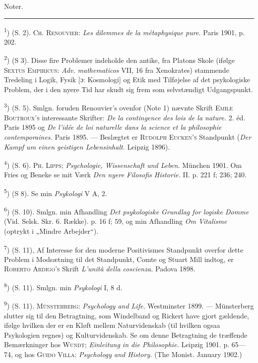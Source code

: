 \documentclass[12pt,a4paper,openany]{book}
\newcommand{\opage}[1]{\marginnote{\footnotesize\textit{[#1]}}}
\begin{document}
\begin{small}
\opage{85}

\begin{center}{\LARGE Noter.}\\[6pt]\rule{1.5cm}{0.4pt}\end{center}

\textsuperscript{1}) (S. 2). \textsc{Ch. Renouvier}: \textit{Les dilemmes de la
métaphysique pure.} Paris 1901, p. 202.

\textsuperscript{2}) (S 3). %
 Disse fire Problemer indeholde den antike, fra Platons Skole (ifølge
\textsc{Sextus} \textsc{Empiricus}: \textit{Adv. mathematicos} VII, 16 fra
Xenokrates) stammende Tredeling i Logik, Fysik [ɔ: Kosmologi] og Etik med
Tilføjelse af det psykologiske Problem, der i den nyere Tid har skudt sig frem
som selvstændigt Udgangspunkt.

\textsuperscript{3}) (S. 5). Smlgn. foruden Renouvier's ovenfor (Note 1) nævnte
Skrift \textsc{Emile Boutroux's} interessante Skrifter: \textit{De la
contingence des lois de la nature.} 2. éd. Paris 1895 og \textit{De l'idée de
loi naturelle dans la science et la philosophie contemporaines.} Paris 1895.
--- Beslægtet er \textsc{Rudolph Eucken's} Standpunkt (\textit{Der Kampf um
einen geistigen Lebensinhalt.} Leipzig 1896).

\textsuperscript{4}) (S. 6). \textsc{Ph.} \textsc{Lipps}; \textit{Psychologie,
Wissenschaft und Leben.} München 1901. Om Fries og Beneke se mit Værk
\textit{Den nyere Filosofis Historie.} II. p. 221 f; 236; 240.

\textsuperscript{5}) (S 8). %
 Se min \textit{Psykologi} V A, 2.

\textsuperscript{6}) (S. 10). Smlgn. min Afhandling \textit{Det psykologiske
Grundlag for logiske Domme} (Vid. Selsk. Skr. 6. Række). p. 16 f; 59, og min
Afhandling \textit{Om Vitalisme} (optrykt i „Mindre Arbejder“).

\textsuperscript{7}) (S. 11), Af Interesse for den moderne Positivismes
Standpunkt overfor dette Problem i Modsætning til det Standpunkt, Comte og
Stuart Mill indtog, er \textsc{Roberto Ardigo's} Skrift \textit{L'unità della
coscienza.} Padova 1898.

\textsuperscript{8}) (S. 11). Smlgn. min \textit{Psykologi} I, 8 d.

\textsuperscript{9}) (S. 11). \textsc{Münstehrerg}: \textit{Psychology and
Life.} Westminster 1899. --- Münsterberg slutter sig til den Betragtning, som
Windelband og Rickert have gjort gældende, ifølge hvilken der er en Kløft
mellem Naturvidenskab (til hvilken ogsaa Psykologien regnes) og
Kulturvidenskab. Se om denne Betragtning de træffende Bemærkninger hos
\textsc{Wundt;} \textit{Einleitung in die Philosophie.} Leipzig 1901. p.
65---74, og hos \textsc{Guido Villa}: \textit{Psychology and History.} (The
Monist. January 1902.)


\end{small}
\end{document}
